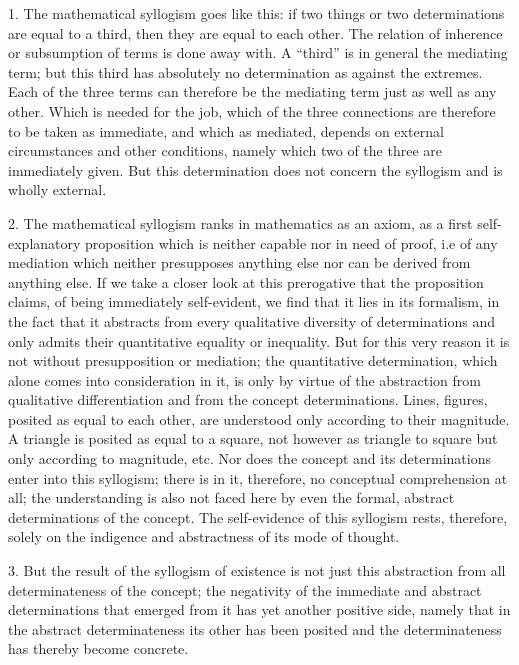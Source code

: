1. The mathematical syllogism goes like this:
if two things or two determinations are equal to a third,
then they are equal to each other.
The relation of inherence or subsumption of terms is done away with.
A “third” is in general the mediating term;
but this third has absolutely no determination as against the extremes.
Each of the three terms can therefore be the mediating term
just as well as any other.
Which is needed for the job,
which of the three connections are
therefore to be taken as immediate,
and which as mediated,
depends on external circumstances and other conditions,
namely which two of the three are immediately given.
But this determination does not concern the syllogism
and is wholly external.

2. The mathematical syllogism ranks in mathematics as an axiom,
as a first self-explanatory proposition
which is neither capable nor in need of proof,
i.e of any mediation which neither presupposes anything else
nor can be derived from anything else.
If we take a closer look at this prerogative
that the proposition claims, of being immediately self-evident,
we find that it lies in its formalism,
in the fact that it abstracts from
every qualitative diversity of determinations
and only admits their quantitative equality or inequality.
But for this very reason it is not without presupposition or mediation;
the quantitative determination,
which alone comes into consideration in it,
is only by virtue of the abstraction from qualitative differentiation
and from the concept determinations.
Lines, figures, posited as equal to each other,
are understood only according to their magnitude.
A triangle is posited as equal to a square,
not however as triangle to square
but only according to magnitude, etc.
Nor does the concept and its determinations enter into this syllogism;
there is in it, therefore, no conceptual comprehension at all;
the understanding is also not faced here by even
the formal, abstract determinations of the concept.
The self-evidence of this syllogism rests,
therefore, solely on the indigence and abstractness
of its mode of thought.

3. But the result of the syllogism of existence is not
just this abstraction from all determinateness of the concept;
the negativity of the immediate and abstract determinations
that emerged from it has yet another positive side,
namely that in the abstract determinateness
its other has been posited
and the determinateness has thereby become concrete.


